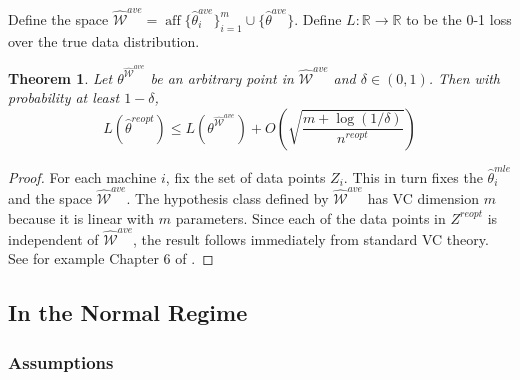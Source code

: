 \documentclass[twoside]{article}
\newtheorem{theorem}{Theorem}
\DeclareMathOperator*{\affspan}{aff}
\newcommand{\Wave}{{\mathcal{\hat W}^{ave}}}
\newcommand{\w}{\theta}
\newcommand{\wreopt}{\hat\w^{reopt}}
\newcommand{\wave}{\hat\w^{ave}}
\newcommand{\wmle}{\hat\w^{mle}}
\newcommand{\fixme}[1]{\textbf{FIXME:} {#1}}
\begin{document}
Define the space
$\Wave=\affspan\{\wave_i\}_{i=1}^m\cup\{\wave\}$.
Define $L : \mathbb{R} \to \mathbb{R}$ to be the 0-1 loss over the true data distribution.

\begin{theorem}
Let $\w^\Wave$ be an arbitrary point in $\Wave$ and $\delta\in(0,1)$.
Then with probability at least $1-\delta$,
\begin{equation}
L(\wreopt) \le L(\w^\Wave) + O\left(\sqrt{\frac{m + \log(1/\delta)}{n^{reopt}}}\right)
\end{equation}
\end{theorem}
\begin{proof}
For each machine $i$, fix the set of data points $Z_i$.
This in turn fixes the $\wmle_i$ and the space $\Wave$.
The hypothesis class defined by $\Wave$ has VC dimension $m$ because it is linear with $m$ parameters.
Since each of the data points in $Z^{reopt}$ is independent of $\Wave$,
the result follows immediately from standard VC theory.
See for example Chapter 6 of \cite{shalev2014understanding}.
%
\end{proof}

\subsection{In the Normal Regime}
\label{sec:normal}

\subsubsection{Assumptions}
\end{document}
